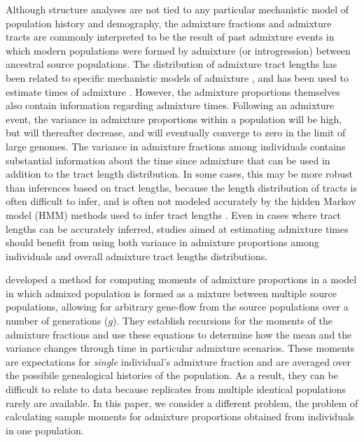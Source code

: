 \documentclass[11pt]{amsart}
\begin{document}
Although structure analyses are not tied to any particular mechanistic model of population history and demography, the admixture fractions and admixture tracts are commonly interpreted to be the result of past admixture events in which modern populations were formed by admixture (or introgression) between ancestral source populations. The distribution of admixture tract lengths has been related to specific mechanistic models of admixture \citep{falush2003inference,tang2006reconstructing,pool2009inference}, and has been used to estimate times of admixture \citep{gravel2012population}. However, the admixture proportions themselves also contain information regarding admixture times. Following an admixture event, the variance in admixture proportions within a population will be high, but will thereafter decrease, and will eventually converge to zero in the limit of large genomes.  
The variance in admixture fractions among individuals contains substantial information about the time since admixture that can be used in addition to the tract length distribution.  
In some cases, this may be more robust than inferences based on tract lengths, because the length distribution of tracts is often difficult to infer, and is often not modeled accurately by the hidden Markov model (HMM) methods used to infer tract lengths \citep{liang2014lengths}.
Even in cases where tract lengths can be accurately inferred, studies aimed at estimating admixture times should benefit from using both variance in admixture proportions among individuals and overall admixture tract lengths distributions.  

\citet{verdu2011general} developed a method for computing moments of admixture proportions in a model in which admixed population is formed as a mixture between multiple source populations, allowing for arbitrary gene-flow from the source populations over a number of generations ($g$). They establish recursions for the moments of the admixture fractions and use these equations to determine how the mean and the variance changes through time in particular admixture scenarios. These moments are expectations for \textit{single} individual's admixture fraction and are averaged over the possibile genealogical histories of the population. As a result, they can be difficult to relate to data because replicates from multiple identical populations rarely are available. In this paper, we consider a different problem, the problem of calculating sample moments for admixture proportions obtained from individuals in one population. 
\end{document}

